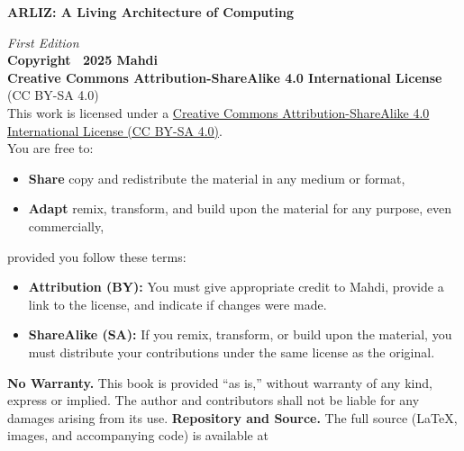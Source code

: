\thispagestyle{empty}
\begin{center}
	\newpage    
	{\footnotesize
		\textbf{ARLIZ: A Living Architecture of Computing}\\
		\vspace{0.5em}
		\textit{First Edition}\\
		\vspace{1.5em}
		\textbf{Copyright \textcopyright\ 2025 Mahdi}\\
		\vspace{1em}
		\textbf{Creative Commons Attribution-ShareAlike 4.0 International License}\\
		(CC BY-SA 4.0)\\
		\vspace{1.5em}
		This work is licensed under a \href{https://creativecommons.org/licenses/by-sa/4.0/}{Creative Commons Attribution-ShareAlike 4.0 International License (CC BY-SA 4.0)}.\\
		You are free to:\newline
		\begin{itemize}\itemsep0pt
			\item \textbf{Share} \— copy and redistribute the material in any medium or format,\newline
			\item \textbf{Adapt} \— remix, transform, and build upon the material for any purpose, even commercially,
		\end{itemize}
		provided you follow these terms:\newline
		\begin{itemize}\itemsep0pt
			\item \textbf{Attribution (BY):} You must give appropriate credit to Mahdi, provide a link to the license, and indicate if changes were made.\\
			\item \textbf{ShareAlike (SA):} If you remix, transform, or build upon the material, you must distribute your contributions under the same license as the original.
		\end{itemize}
		\vspace{1.5em}
		\textbf{No Warranty.} This book is provided “as is,” without warranty of any kind, express or implied. The author and contributors shall not be liable for any damages arising from its use.\newline
		\textbf{Repository and Source.} The full source (LaTeX, images, and accompanying code) is available at\newline
}
\end{center}
